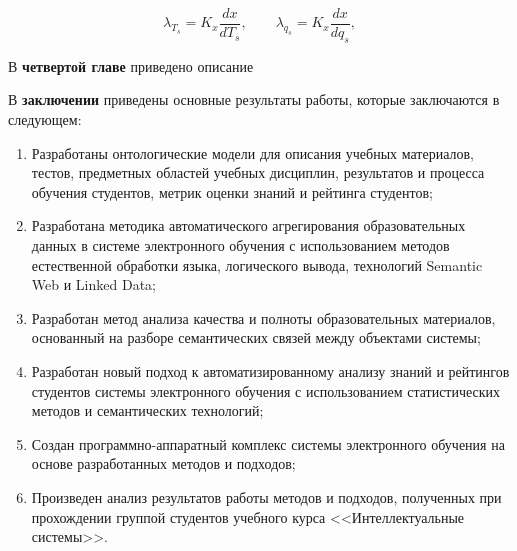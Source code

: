 $$
  \lambda_{T_s} = K_x\frac{d{x}}{d{T_s}}, \qquad
  \lambda_{q_s} = K_x\frac{d{x}}{d{q_s}},
$$

В \textbf{четвертой главе} приведено описание 

В \textbf{заключении} приведены основные результаты работы, которые заключаются в следующем:
\begin{enumerate}
 \item Разработаны онтологические модели для описания учебных материалов, тестов, предметных областей учебных дисциплин, результатов и процесса обучения студентов, метрик оценки знаний и рейтинга студентов;
 \item Разработана методика автоматического агрегирования образовательных данных в системе электронного обучения с использованием методов естественной обработки языка, логического вывода, технологий Semantic Web и Linked Data;
 \item Разработан метод анализа качества и полноты образовательных материалов, основанный на разборе семантических связей между объектами системы;
  \item Разработан новый подход к автоматизированному анализу знаний и рейтингов студентов системы электронного обучения с использованием статистических методов и семантических технологий;
  \item Создан программно-аппаратный комплекс системы электронного обучения на основе разработанных методов и подходов;
  \item Произведен анализ результатов работы методов и подходов, полученных при прохождении группой студентов учебного курса <<Интеллектуальные системы>>.
  \end{enumerate}


\renewcommand{\refname}{\Large Публикации автора по теме диссертации}
\nocite{*}
